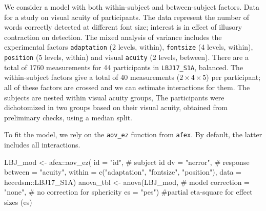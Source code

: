 \documentclass[
  11pt,
  letterpaper,
]{scrbook}
\newenvironment{Shaded}{\begin{snugshade}}{\end{snugshade}}
\newcommand{\AttributeTok}[1]{\textcolor[rgb]{0.40,0.45,0.13}{#1}}
\newcommand{\CommentTok}[1]{\textcolor[rgb]{0.37,0.37,0.37}{#1}}
\newcommand{\FunctionTok}[1]{\textcolor[rgb]{0.28,0.35,0.67}{#1}}
\newcommand{\NormalTok}[1]{\textcolor[rgb]{0.00,0.23,0.31}{#1}}
\newcommand{\OtherTok}[1]{\textcolor[rgb]{0.00,0.23,0.31}{#1}}
\newcommand{\SpecialCharTok}[1]{\textcolor[rgb]{0.37,0.37,0.37}{#1}}
\newcommand{\StringTok}[1]{\textcolor[rgb]{0.13,0.47,0.30}{#1}}
\theoremstyle{definition}
\theoremstyle{remark}
\begin{document}
We consider a model with both within-subject and between-subject
factors. Data for a study on visual acuity of participants. The data
represent the number of words correctly detected at different font size;
interest is in effect of illusory contraction on detection. The mixed
analysis of variance includes the experimental factors
\texttt{adaptation} (2 levels, within), \texttt{fontsize} (4 levels,
within), \texttt{position} (5 levels, within) and visual \texttt{acuity}
(2 levels, between). There are a total of 1760 measurements for 44
participants in \texttt{LBJ17\_S1A}, balanced. The within-subject
factors give a total of 40 measurements (\(2 \times 4 \times 5\)) per
participant; all of these factors are crossed and we can estimate
interactions for them. The subjects are nested within visual acuity
groups, The participants were dichotomized in two groups based on their
visual acuity, obtained from preliminary checks, using a median split.

To fit the model, we rely on the \texttt{aov\_ez} function from
\texttt{afex}. By default, the latter includes all interactions.

\begin{Shaded}
\begin{Highlighting}[]
\NormalTok{LBJ\_mod }\OtherTok{\textless{}{-}}\NormalTok{ afex}\SpecialCharTok{::}\FunctionTok{aov\_ez}\NormalTok{(}
  \AttributeTok{id =} \StringTok{"id"}\NormalTok{,     }\CommentTok{\# subject id}
  \AttributeTok{dv =} \StringTok{"nerror"}\NormalTok{, }\CommentTok{\# response}
  \AttributeTok{between =} \StringTok{"acuity"}\NormalTok{,}
  \AttributeTok{within =} \FunctionTok{c}\NormalTok{(}\StringTok{"adaptation"}\NormalTok{,}
             \StringTok{"fontsize"}\NormalTok{, }
             \StringTok{"position"}\NormalTok{),}
  \AttributeTok{data =}\NormalTok{ hecedsm}\SpecialCharTok{::}\NormalTok{LBJ17\_S1A)}
\NormalTok{anova\_tbl }\OtherTok{\textless{}{-}} \FunctionTok{anova}\NormalTok{(LBJ\_mod,  }\CommentTok{\# model}
      \AttributeTok{correction =} \StringTok{"none"}\NormalTok{, }\CommentTok{\# no correction for sphericity}
      \AttributeTok{es =} \StringTok{"pes"}\NormalTok{) }
\CommentTok{\#partial eta{-}square for effect sizes (es)}
\end{Highlighting}
\end{Shaded}
\end{document}
